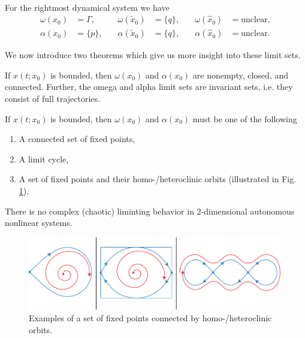\begin{ex}
\begin{subequations}
\begin{align}
\end{align}
\end{subequations}
	For the rightmost dynamical system we have 
	\begin{subequations}
\begin{align}
	\omega(x_0) &= \Gamma, \quad &\omega(\tilde{x}_0) &= \{q\}, \quad &{\omega }(\hat{x}_0)&=  \textrm{unclear}, \\
	\alpha(x_0)&= \{p\} , \quad & \alpha(\tilde{x}_0)&=\{q\},\quad &\alpha(\hat{x}_0)&= \textrm{unclear} .
\end{align}
\end{subequations}
\end{ex}

We now introduce two theorems which give us more insight into these limit sets.
\begin{theorem}[]
	If $x(t;x_0)$ is bounded, then $\omega(x_0)$ and $\alpha(x_0)$ are nonempty, closed, and connected. Further, the omega and alpha limit sets are invariant sets, i.e. they consist of full trajectories.
\end{theorem}
\begin{theorem}
	If $x(t;x_0)$ is bounded, then $\omega(x_0)$ and $\alpha(x_0)$ must be one of the following 
	\begin{enumerate}
		\item A connected set of fixed points,
		\item A limit cycle,
		\item A set of fixed points and their homo-/heteroclinic orbits (illustrated in Fig. \ref{fig:poincare-bendixon}).
	\end{enumerate}
	There is no complex (chaotic) liminting behavior in 2-dimensional autonomous nonlinear systems. 
	\begin{figure}[h!]
		\centering
		\includegraphics[width=0.99\textwidth]{figures/ch4/8poincare-bendixon.pdf}
		\caption{Examples of a set of fixed points connected by homo-/heteroclinic orbits.}
		\label{fig:poincare-bendixon}
	\end{figure}	
\end{theorem}
